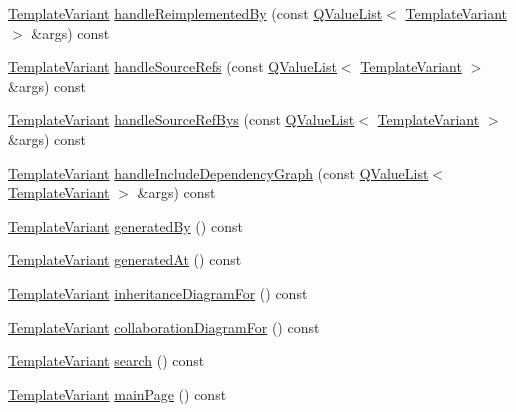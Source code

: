 \begin{DoxyCompactItemize}
\item 
\hyperlink{class_template_variant}{Template\+Variant} \hyperlink{class_translate_context_1_1_private_af10c6ade42a48ff4caf9a2ff813229ac}{handle\+Reimplemented\+By} (const \hyperlink{class_q_value_list}{Q\+Value\+List}$<$ \hyperlink{class_template_variant}{Template\+Variant} $>$ \&args) const 
\item 
\hyperlink{class_template_variant}{Template\+Variant} \hyperlink{class_translate_context_1_1_private_a52180687176f14c3ffe2229472ef9d35}{handle\+Source\+Refs} (const \hyperlink{class_q_value_list}{Q\+Value\+List}$<$ \hyperlink{class_template_variant}{Template\+Variant} $>$ \&args) const 
\item 
\hyperlink{class_template_variant}{Template\+Variant} \hyperlink{class_translate_context_1_1_private_a3f5e83aa052a452d12f51aca4aeaca1b}{handle\+Source\+Ref\+Bys} (const \hyperlink{class_q_value_list}{Q\+Value\+List}$<$ \hyperlink{class_template_variant}{Template\+Variant} $>$ \&args) const 
\item 
\hyperlink{class_template_variant}{Template\+Variant} \hyperlink{class_translate_context_1_1_private_ab75a37957a58c10de01724bac9bd7c1b}{handle\+Include\+Dependency\+Graph} (const \hyperlink{class_q_value_list}{Q\+Value\+List}$<$ \hyperlink{class_template_variant}{Template\+Variant} $>$ \&args) const 
\item 
\hyperlink{class_template_variant}{Template\+Variant} \hyperlink{class_translate_context_1_1_private_ae22c1f74b5d1f628f8408ea2c62c182e}{generated\+By} () const 
\item 
\hyperlink{class_template_variant}{Template\+Variant} \hyperlink{class_translate_context_1_1_private_a39628eed19ceff991a1f186e6b219853}{generated\+At} () const 
\item 
\hyperlink{class_template_variant}{Template\+Variant} \hyperlink{class_translate_context_1_1_private_af6e261138274eab360c9e30eca177f86}{inheritance\+Diagram\+For} () const 
\item 
\hyperlink{class_template_variant}{Template\+Variant} \hyperlink{class_translate_context_1_1_private_a89e3295c05d7fae1c215c1aec5127454}{collaboration\+Diagram\+For} () const 
\item 
\hyperlink{class_template_variant}{Template\+Variant} \hyperlink{class_translate_context_1_1_private_acfaca150a3e8dad65cfae204255bc8fe}{search} () const 
\item 
\hyperlink{class_template_variant}{Template\+Variant} \hyperlink{class_translate_context_1_1_private_ab7d23e68b5b124c7199458eaa6355d40}{main\+Page} () const 

\end{DoxyCompactItemize}

